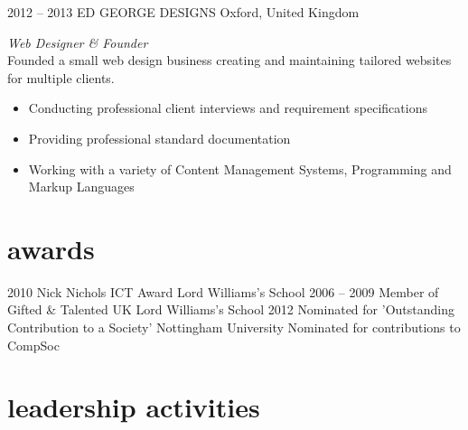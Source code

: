 \documentclass[]{friggeri-cv} %
\begin{document}
\begin{entrylist}
{\begin{itemize}
\end{itemize}}
\entry
{2012 -- 2013}
{ED GEORGE DESIGNS}
{Oxford, United Kingdom}
{\emph{Web Designer \& Founder} \\
Founded a small web design business creating and maintaining tailored websites for multiple clients.
\begin{itemize}
\item Conducting professional client interviews and requirement specifications
\item Providing professional standard documentation
\item Working with a variety of Content Management Systems, Programming and Markup Languages
\end{itemize}}

\end{entrylist}


\section{awards}

\begin{entrylist}
\entry
{2010}
{Nick Nichols ICT Award}
{Lord Williams's School}
{}
\entry
{2006 -- 2009}
{Member of Gifted \& Talented UK}
{Lord Williams's School}
{}
\entry
{2012}
{Nominated for 'Outstanding Contribution to a Society'}
{Nottingham University}
{Nominated for contributions to CompSoc}
\end{entrylist}


\section{leadership activities}
\end{document}
